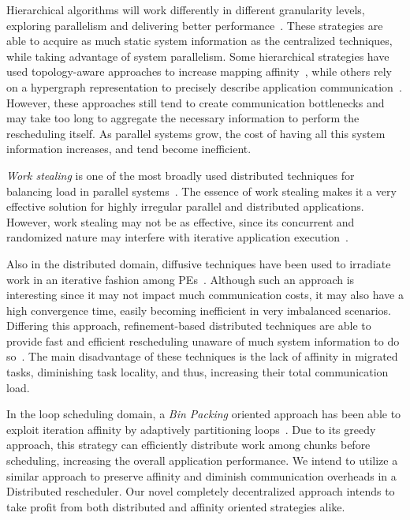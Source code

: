 Hierarchical algorithms will work differently in different granularity levels, exploring parallelism and delivering better performance~\cite{hybrid,nuco}.
These strategies are able to acquire as much static system information as the centralized techniques, while taking advantage of system parallelism.
Some hierarchical strategies have used topology-aware approaches to increase mapping affinity~\cite{nuco,hwtopo}, while others rely on a hypergraph representation to precisely describe application communication~\cite{ZoltanParHypRepart07}.
However, these approaches still tend to create communication bottlenecks and may take too long to aggregate the necessary information to perform the rescheduling itself.
As parallel systems grow, the cost of having all this system information increases, and tend become inefficient.

\textit{Work stealing} is one of the most broadly used distributed techniques for balancing load in parallel systems~\cite{DBLP:journals/ijpp/YangH18,Janjic2013}.
The essence of work stealing makes it a very effective solution for highly irregular parallel and distributed applications.
However, work stealing may not be as effective, since its concurrent and randomized nature may interfere with iterative application execution~\cite{lifflander2012work}.

Also in the distributed domain, diffusive techniques have been used to irradiate work in an iterative fashion among PEs~\cite{diffus}.
Although such an approach is interesting since it may not impact much communication costs, it may also have a high convergence time, easily becoming inefficient in very imbalanced scenarios.
Differing this approach, refinement-based distributed techniques are able to provide fast and efficient rescheduling unaware of much system information to do so~\cite{grapevine}.
The main disadvantage of these techniques is the lack of affinity in migrated tasks, diminishing task locality, and thus, increasing their total communication load.

In the loop scheduling domain, a \textit{Bin Packing} oriented approach has been able to exploit iteration affinity by adaptively partitioning loops~\cite{Castro-Penna-WSCAD:2017}.
Due to its greedy approach, this strategy can efficiently distribute work among chunks before scheduling, increasing the overall application performance.
We intend to utilize a similar approach to preserve affinity and diminish communication overheads in a Distributed rescheduler.
Our novel completely decentralized approach intends to take profit from both distributed and affinity oriented strategies alike.

